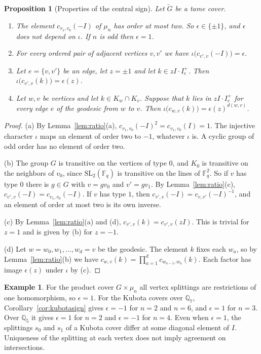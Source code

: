 \documentclass[12pt,letterpaper]{article}
\numberwithin{equation}{section}
\newtheorem{proposition}[theorem]{Proposition}
\theoremstyle{definition}
\newtheorem{example}[theorem]{Example}
\theoremstyle{remark}
\newcommand{\kk}{\mathbb F_q}
\newcommand{\Gt}{\widetilde G}
\newcommand{\sgn}{\epsilon}
\begin{document}
\begin{proposition}[Properties of the central sign]\label{prop:sign}
Let $\Gt$ be a tame cover.
\begin{enumerate}[label=(\alph*),leftmargin=2.2em]
\item The element $c_{v_1,v_0}(-I)$ of $\mu_n$ has order at most two. So $\sgn\in\{\pm1\}$, and $\sgn$ does not depend on $\iota$. If $n$ is odd then $\sgn=1$.
\item For every ordered pair of adjacent vertices $v,v'$ we have $\iota\bigl(c_{v',v}(-I)\bigr)=\sgn$.
\item Let $e=\{v,v'\}$ be an edge, let $z=\pm1$ and let $k\in zI\cdot I_e^+$. Then $\iota\bigl(c_{v',v}(k)\bigr)=\sgn(z)$.
\item Let $w,v$ be vertices and let $k\in K_w\cap K_v$. Suppose that $k$ lies in $zI\cdot I_e^+$ for every edge $e$ of the geodesic from $w$ to $v$. Then $\iota\bigl(c_{w,v}(k)\bigr)=\sgn(z)^{d(w,v)}$.
\end{enumerate}
\end{proposition}
\begin{proof}
(a) By Lemma~\ref{lem:ratio}(a), $c_{v_1,v_0}(-I)^2=c_{v_1,v_0}(I)=1$. The injective character $\iota$ maps an element of order two to $-1$, whatever $\iota$ is. A cyclic group of odd order has no element of order two.

(b) The group $G$ is transitive on the vertices of type $0$, and $K_0$ is transitive on the neighbors of $v_0$, since $\mathrm{SL}_2(\kk)$ is transitive on the lines of $\kk^2$. So if $v$ has type $0$ there is $g\in G$ with $v=gv_0$ and $v'=gv_1$. By Lemma~\ref{lem:ratio}(c), $c_{v',v}(-I)=c_{v_1,v_0}(-I)$. If $v$ has type $1$, then $c_{v',v}(-I)=c_{v,v'}(-I)^{-1}$, and an element of order at most two is its own inverse.

(c) By Lemma~\ref{lem:ratio}(a) and (d), $c_{v',v}(k)=c_{v',v}(zI)$. This is trivial for $z=1$ and is given by (b) for $z=-1$.

(d) Let $w=w_0,w_1,\ldots,w_d=v$ be the geodesic. The element $k$ fixes each $w_a$, so by Lemma~\ref{lem:ratio}(b) we have $c_{w,v}(k)=\prod_{a=1}^dc_{w_{a-1},w_a}(k)$. Each factor has image $\sgn(z)$ under $\iota$ by (c).
\end{proof}

\begin{example}\label{ex:signs}
For the product cover $G\times\mu_n$ all vertex splittings are restrictions of one homomorphism, so $\sgn=1$. For the Kubota covers over $\mathbb Q_7$, Corollary~\ref{cor:kubotasign} gives $\sgn=-1$ for $n=2$ and $n=6$, and $\sgn=1$ for $n=3$. Over $\mathbb Q_5$ it gives $\sgn=1$ for $n=2$ and $\sgn=-1$ for $n=4$. Even when $\sgn=1$, the splittings $s_0$ and $s_1$ of a Kubota cover differ at some diagonal element of $I$. Uniqueness of the splitting at each vertex does not imply agreement on intersections.
\end{example}
\end{document}
